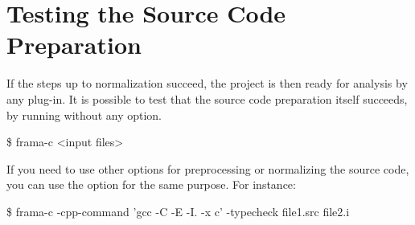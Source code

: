 \section{Testing the Source Code Preparation}

If the steps up to normalization succeed, the project is then ready for
analysis by any \FramaC plug-in. It is possible to test that the source code
preparation itself succeeds, by running \FramaC without any option.
\begin{frama-c-commands}
\$ frama-c <input files>
\end{frama-c-commands}

If you need to use other options for preprocessing or normalizing the source
code, you can use the option  for
the same purpose. For instance:
\begin{frama-c-commands}
\$ frama-c -cpp-command 'gcc -C -E -I. -x c' -typecheck file1.src file2.i
\end{frama-c-commands}


